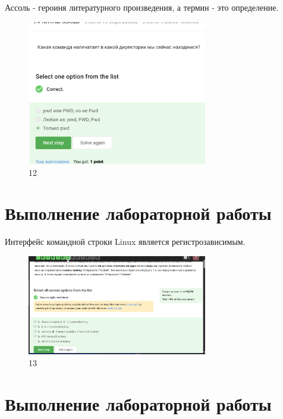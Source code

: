Ассоль - героиня литературного произведения, а термин - это определение.

\begin{figure}
\hypertarget{fig:012}{%
\centering
\includegraphics[width=0.7\textwidth,height=\textheight]{image/12.png}
\caption{12}\label{fig:012}
}
\end{figure}

\hypertarget{ux432ux44bux43fux43eux43bux43dux435ux43dux438ux435-ux43bux430ux431ux43eux440ux430ux442ux43eux440ux43dux43eux439-ux440ux430ux431ux43eux442ux44b-9}{%
\section{Выполнение лабораторной
работы}\label{ux432ux44bux43fux43eux43bux43dux435ux43dux438ux435-ux43bux430ux431ux43eux440ux430ux442ux43eux440ux43dux43eux439-ux440ux430ux431ux43eux442ux44b-9}}

Интерфейс командной строки Linux является регистрозависимым.

\begin{figure}
\hypertarget{fig:013}{%
\centering
\includegraphics[width=0.7\textwidth,height=\textheight]{image/13.png}
\caption{13}\label{fig:013}
}
\end{figure}

\hypertarget{ux432ux44bux43fux43eux43bux43dux435ux43dux438ux435-ux43bux430ux431ux43eux440ux430ux442ux43eux440ux43dux43eux439-ux440ux430ux431ux43eux442ux44b-10}{%
\section{Выполнение лабораторной
работы}\label{ux432ux44bux43fux43eux43bux43dux435ux43dux438ux435-ux43bux430ux431ux43eux440ux430ux442ux43eux440ux43dux43eux439-ux440ux430ux431ux43eux442ux44b-10}}

